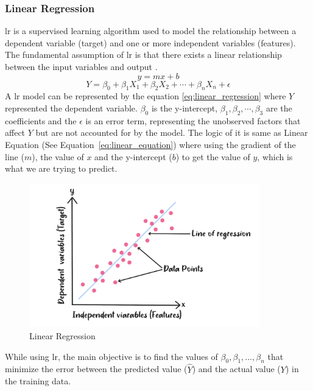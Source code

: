\subsubsection{Linear Regression}
\nocite{mali_2021_linear}
\nocite{rohithgandhi_2018_introduction}
\nocite{kwiatkowski_2021_gradient,ibm_what}
\nocite{_2019_descending}
\gls{lr} is a supervised learning algorithm used to model the relationship between a dependent variable (target) and one or more independent variables (features).
The fundamental assumption of \gls{lr} is that there exists a linear relationship between the input variables and output \citep{ibm_2022_about}.
\begin{equation} \label{eq:linear_equation}
    y = mx + b
\end{equation}
\begin{equation} \label{eq:linear_regression}
    Y = \beta_0 + \beta_{1}X_{1} + \beta_{2}X_{2} + \cdots + \beta_{n}X_{n} + \epsilon
\end{equation}
\indent A \gls{lr} model can be represented by the equation \ref{eq:linear_regression} where $Y$ represented the dependent variable. 
$\beta_0$ is the y-intercept, $\beta_1, \beta_2, \cdots, \beta_3$ are the coefficients  and the $\epsilon$ is an error term, representing the unobserved factors that affect $Y$ but are not accounted for by the model.
The logic of it is same as Linear Equation (See Equation~\ref{eq:linear_equation}) where using the gradient of the line ($m$), the value of $x$ and the y-intercept ($b$) to get the value of $y$, which is what we are trying to predict. 
\begin{figure}[H]
    \centering
    \includegraphics[width=10cm]{Images/lr.png}
    \caption{Linear Regression}
    \label{fig:lr}
\end{figure}
\indent While using \gls{lr}, the main objective is to find the values of $\beta_0, \beta_1,...,\beta_n$ that minimize the error between the predicted value ($\hat{Y}$) and the actual value ($Y$) in the training data.
